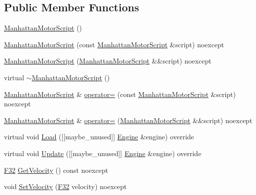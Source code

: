 \subsection*{Public Member Functions}
\begin{DoxyCompactItemize}
\item 
\hyperlink{classmage_1_1script_1_1_manhattan_motor_script_a042ae1a4a53d27c75ff85d5728ac3289}{Manhattan\+Motor\+Script} ()
\item 
\hyperlink{classmage_1_1script_1_1_manhattan_motor_script_a5c3bc9b400243333b661e4fd0e6e74b6}{Manhattan\+Motor\+Script} (const \hyperlink{classmage_1_1script_1_1_manhattan_motor_script}{Manhattan\+Motor\+Script} \&script) noexcept
\item 
\hyperlink{classmage_1_1script_1_1_manhattan_motor_script_a62843ba8d660b496bec036082a0867f6}{Manhattan\+Motor\+Script} (\hyperlink{classmage_1_1script_1_1_manhattan_motor_script}{Manhattan\+Motor\+Script} \&\&script) noexcept
\item 
virtual \hyperlink{classmage_1_1script_1_1_manhattan_motor_script_aca76d9d5be76b048ec247e93e4a89adb}{$\sim$\+Manhattan\+Motor\+Script} ()
\item 
\hyperlink{classmage_1_1script_1_1_manhattan_motor_script}{Manhattan\+Motor\+Script} \& \hyperlink{classmage_1_1script_1_1_manhattan_motor_script_a1c4dc4ffae903942248c7f744b0d019f}{operator=} (const \hyperlink{classmage_1_1script_1_1_manhattan_motor_script}{Manhattan\+Motor\+Script} \&script) noexcept
\item 
\hyperlink{classmage_1_1script_1_1_manhattan_motor_script}{Manhattan\+Motor\+Script} \& \hyperlink{classmage_1_1script_1_1_manhattan_motor_script_a3184ea5b921fbdbd81173db3f7042a0c}{operator=} (\hyperlink{classmage_1_1script_1_1_manhattan_motor_script}{Manhattan\+Motor\+Script} \&\&script) noexcept
\item 
virtual void \hyperlink{classmage_1_1script_1_1_manhattan_motor_script_ac93b09e8f82932f7071b1f591a8004e9}{Load} (\mbox{[}\mbox{[}maybe\+\_\+unused\mbox{]}\mbox{]} \hyperlink{classmage_1_1_engine}{Engine} \&engine) override
\item 
virtual void \hyperlink{classmage_1_1script_1_1_manhattan_motor_script_af1ee420e1378bf930cce1ce92a37d640}{Update} (\mbox{[}\mbox{[}maybe\+\_\+unused\mbox{]}\mbox{]} \hyperlink{classmage_1_1_engine}{Engine} \&engine) override
\item 
\hyperlink{namespacemage_aa97e833b45f06d60a0a9c4fc22ae02c0}{F32} \hyperlink{classmage_1_1script_1_1_manhattan_motor_script_a2f73545bf2fb507375251d530054ac9b}{Get\+Velocity} () const noexcept
\item 
void \hyperlink{classmage_1_1script_1_1_manhattan_motor_script_acf4db52ae6b0c9f97c0b7e719acea6bc}{Set\+Velocity} (\hyperlink{namespacemage_aa97e833b45f06d60a0a9c4fc22ae02c0}{F32} velocity) noexcept
\end{DoxyCompactItemize}
